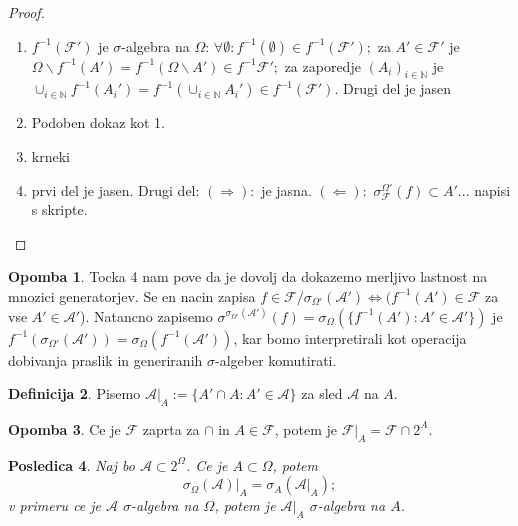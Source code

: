\documentclass[a4paper,12pt]{article}
\theoremstyle{definition} %
\newtheorem{definicija}{Definicija}[section]
\newtheorem{opomba}[definicija]{Opomba}
\theoremstyle{plain} %
\newtheorem{posledica}[definicija]{Posledica}
\newcommand{\N}{\mathbb{N}}
\newcommand{\F}{\mathcal{F}}
\newcommand{\A}{\mathcal{A}}
\begin{document}
            \begin{proof}
                \begin{enumerate}
                    \item $f^{-1}(\F')$ je $\sigma$-algebra na $\Omega$: $\forall \emptyset : f^{-1}(\emptyset) \in f^{-1}(\F');$ za $A'\in \F'$ je $\Omega \backslash f^{-1}(A') = f^{-1}(\Omega \backslash A') \in f^{-1}{\F'};$ za zaporedje $(A_i)_{i \in \N}$ je $\cup_{i \in \N}f^{-1}(A_i') = f^{-1}(\cup_{i \in \N}A_i') \in f^{-1}(\F').$ Drugi del je jasen
                    \item Podoben dokaz kot 1.
                    \item krneki
                    \item prvi del je jasen. Drugi del: $(\Rightarrow):$ je jasna. $(\Leftarrow):$ $\sigma_{\F}^{\Omega '}(f) \subset A'...$ napisi s skripte.
                \end{enumerate}
            \end{proof}

            \begin{opomba}
                Tocka 4 nam pove da je dovolj da dokazemo  merljivo lastnost na mnozici generatorjev. Se en nacin zapisa $f \in \F/\sigma_{\Omega'}(\A') \iff (f^{-1}(A') \in \F$ za vse $A' \in \A'$). Natancno zapisemo $\sigma^{\sigma_{\Omega'}(\A')}(f) = \sigma_\Omega(\{f^{-1}(A'):A' \in \A'\})$ je $f^{-1}(\sigma_{\Omega'}(\A')) = \sigma_\Omega(f^{-1}(\A'))$, kar bomo interpretirali kot operacija dobivanja praslik in generiranih $\sigma$-algeber komutirati.
            \end{opomba}

            \begin{definicija}
                Pisemo $\A|_A := \{A'\cap A : A'\in \A\}$ za sled $\A$ na $A$.
            \end{definicija}

            \begin{opomba}
                Ce je $\F$ zaprta za $\cap$ in $A \in \F$, potem je $\F|_A = \F \cap 2^A$.
            \end{opomba}

            \begin{posledica}
                Naj bo $\A \subset 2^\Omega$. Ce je $A \subset \Omega$, potem $$ \sigma_\Omega(\A)|_A = \sigma_A(\A|_A);$$ v primeru ce je $\A$ $\sigma$-algebra na $\Omega$, potem je $\A|_A$ $\sigma$-algebra na $A$.
            \end{posledica}
\end{document}
